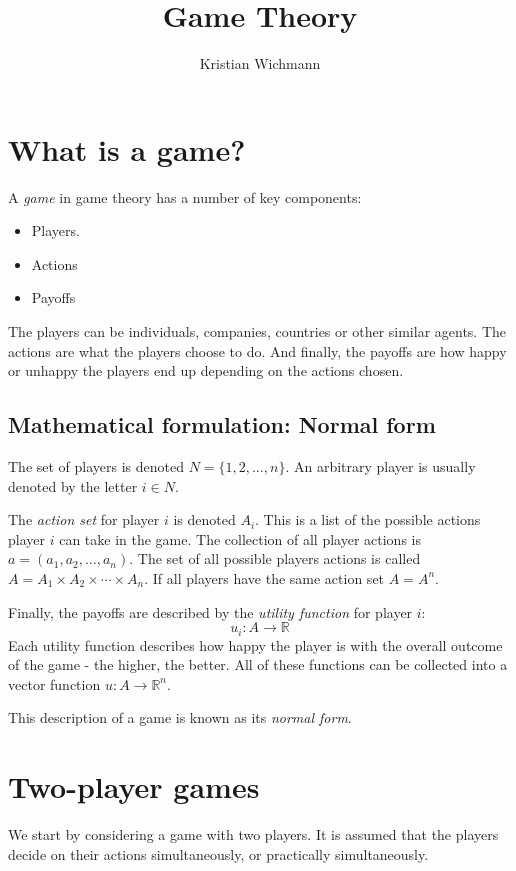 \documentclass[12pt, a4paper]{article}
\title{Game Theory}
\author{Kristian Wichmann}
\begin{document}
\maketitle

\section{What is a game?}
A \textit{game} in game theory has a number of key components:
\begin{itemize}
\item Players.
\item Actions
\item Payoffs
\end{itemize}
The players can be individuals, companies, countries or other similar agents. The actions are what the players choose to do. And finally, the payoffs are how happy or unhappy the players end up depending on the actions chosen.

\subsection{Mathematical formulation: Normal form}
The set of players is denoted $N=\{1, 2,\ldots,n\}$. An arbitrary player is usually denoted by the letter $i\in N$.

The \textit{action set} for player $i$ is denoted $A_i$. This is a list of the possible actions player $i$ can take in the game. The collection of all player actions is $a=(a_1,a_2,\ldots,a_n)$. The set of all possible players actions is called $A=A_1\times A_2\times\cdots\times A_n$. If all players have the same action set $A=A^n$.

Finally, the payoffs are described by the \textit{utility function} for player $i$:
\begin{equation}
u_i: A\rightarrow\mathbb{R}
\end{equation}
Each utility function describes how happy the player is with the overall outcome of the game - the higher, the better. All of these functions can be collected into a vector function $u: A\rightarrow\mathbb{R}^n$.

This description of a game is known as its \textit{normal form}.

\section{Two-player games}
We start by considering a game with two players. It is assumed that the players decide on their actions simultaneously, or practically simultaneously.
\end{document}
